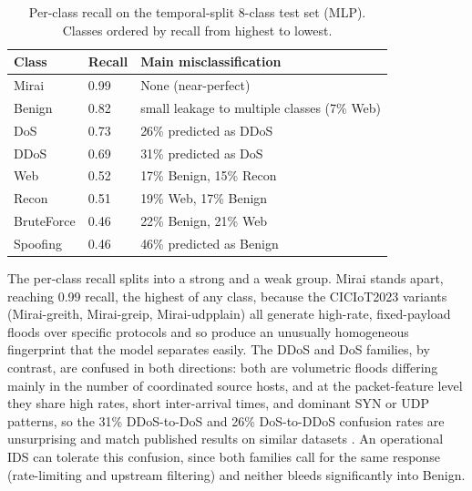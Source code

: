 \begin{table}[htbp]
\begin{center}
\begin{tabular}{|p{70pt}|p{50pt}|p{230pt}|}
\hline
\textbf{Class} & \textbf{Recall} & \textbf{Main misclassification} \\
\hline
\hline Mirai & 0.99 & None (near-perfect) \\
\hline Benign & 0.82 & small leakage to multiple classes (7\% Web) \\
\hline DoS & 0.73 & 26\% predicted as DDoS \\
\hline DDoS & 0.69 & 31\% predicted as DoS \\
\hline Web & 0.52 & 17\% Benign, 15\% Recon \\
\hline Recon & 0.51 & 19\% Web, 17\% Benign \\
\hline BruteForce & 0.46 & 22\% Benign, 21\% Web \\
\hline Spoofing & 0.46 & 46\% predicted as Benign \\
\hline
\end{tabular}
\end{center}
\caption{Per-class recall on the temporal-split 8-class test set (MLP). Classes ordered by recall from highest to lowest.}
\label{tab:recall_8class}
\end{table}

\par The per-class recall splits into a strong and a weak group. Mirai stands apart, reaching 0.99 recall, the highest of any class, because the CICIoT2023 variants (Mirai-greith, Mirai-greip, Mirai-udpplain) all generate high-rate, fixed-payload floods over specific protocols and so produce an unusually homogeneous fingerprint that the model separates easily. The DDoS and DoS families, by contrast, are confused in both directions: both are volumetric floods differing mainly in the number of coordinated source hosts, and at the packet-feature level they share high rates, short inter-arrival times, and dominant SYN or UDP patterns, so the 31\% DDoS-to-DoS and 26\% DoS-to-DDoS confusion rates are unsurprising and match published results on similar datasets \cite{Lansky2021}. An operational IDS can tolerate this confusion, since both families call for the same response (rate-limiting and upstream filtering) and neither bleeds significantly into Benign.

